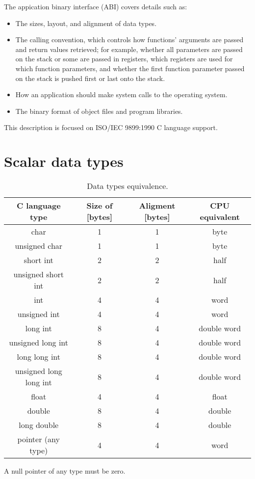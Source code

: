 The appication binary interface (ABI) covers details such as:
\begin{itemize}
\item The sizes, layout, and alignment of data types.
\item The calling convention, which controls how functions' arguments are passed and return values retrieved;
for example, whether all parameters are passed on the stack or some are passed in registers, which registers
are used for which function parameters, and whether the first function parameter passed on the stack is pushed
first or last onto the stack.
\item How an application should make system calls to the operating system.
\item The binary format of object files and program libraries.
\end{itemize}

This description is focused on ISO/IEC 9899:1990 C language support.

\section{Scalar data types}

\begin{table}
  \begin{center}
    \begin{tabular}{|c|c|c|c|}
    \hline
    \textbf{C language type} & \textbf{Size of [bytes]} & \textbf{Aligment [bytes]} & \textbf{CPU equivalent}\\
    \hline
    \hline
    char                   & 1  & 1 & byte \\
    \hline
    unsigned char          & 1  & 1 & byte \\
    \hline
    short int              & 2  & 2 & half \\
    \hline
    unsigned short int     & 2  & 2 & half \\
    \hline
    int                    & 4  & 4 & word \\
    \hline
    unsigned int           & 4  & 4 & word \\
    \hline
    long int               & 8  & 4 & double word \\
    \hline
    unsigned long int      & 8  & 4 & double word \\
    \hline
    long long int          & 8  & 4 & double word  \\
    \hline
    unsigned long long int & 8  & 4 & double word  \\
    \hline
    float                  & 4  & 4 & float \\
    \hline
    double                 & 8  & 4 & double \\
    \hline
    long double            & 8  & 4 & double \\
    \hline
    pointer (any type)     & 4  & 4 & word \\
    \hline
    \end{tabular}
  \caption{Data types equivalence.}
  \label{tbl:abi_data_types}
  \end{center}
\end{table}
A null pointer of any type must be zero.


